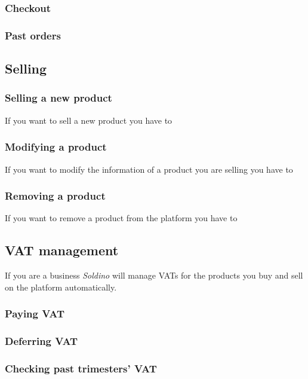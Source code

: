 	\subsubsection{Checkout}
	\subsubsection{Past orders}
	
	\subsection{Selling}
	\subsubsection{Selling a new product}
	If you want to sell a new product you have to
	
	\subsubsection{Modifying a product}
	If you want to modify the information of a product you are selling you 
	have to 
	\subsubsection{Removing a product}
	If you want to remove a product from the platform you have to
	
	\subsection{VAT management}
	If you are a business \textit{Soldino} will manage VATs for the products 
	you buy and sell on the platform automatically.
		\subsubsection{Paying VAT}
	
		\subsubsection{Deferring VAT}
		
		\subsubsection{Checking past trimesters' VAT}
		